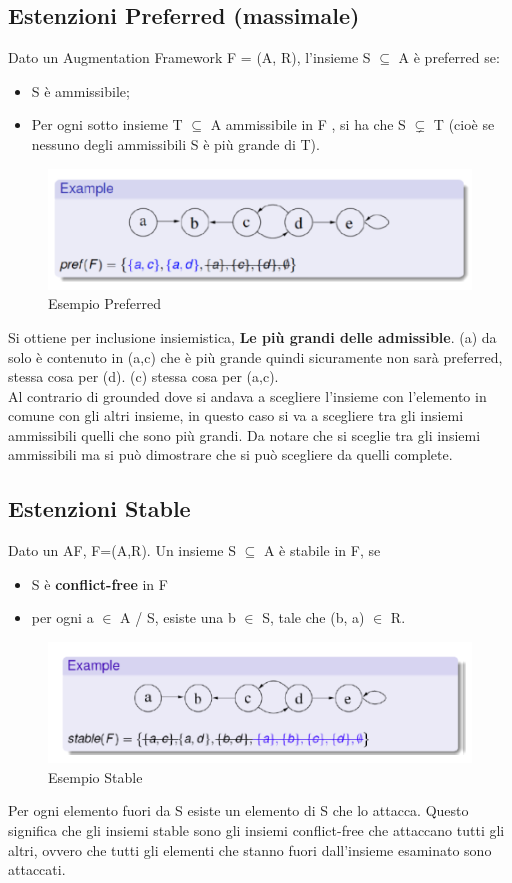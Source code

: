 \subsection{Estenzioni Preferred (massimale)}
Dato un Augmentation Framework F = (A, R), l’insieme S $\subseteq$ A è preferred se:
\begin{itemize}
    \item S è ammissibile;
    \item Per ogni sotto insieme T $\subseteq$ A ammissibile in F , si ha che S $\subsetneq$ T (cioè se nessuno degli ammissibili S è più grande di T).
\end{itemize}
\begin{figure}[htp]
	\centering
    \includegraphics[width=12cm, keepaspectratio]{img/Cap6/prefered.png}
    \caption{Esempio Preferred}
\end{figure}
Si ottiene per inclusione insiemistica, \textbf{Le più grandi delle admissible}. (a) da solo è contenuto in (a,c) che è più grande quindi sicuramente non sarà preferred, stessa cosa per (d). (c) stessa cosa per (a,c).
\\Al contrario di grounded dove si andava a scegliere l’insieme con l’elemento in
comune con gli altri insieme, in questo caso si va a scegliere tra gli insiemi ammissibili
quelli che sono più grandi. Da notare che si sceglie tra gli insiemi ammissibili ma si
può dimostrare che si può scegliere da quelli complete.
\newpage
\subsection{Estenzioni Stable}
Dato un AF, F=(A,R). Un insieme S $\subseteq$ A è stabile in F, se
\begin{itemize}
    \item S è \textbf{conflict-free} in F
    \item per ogni a $\in$ A / S, esiste una b $\in$ S, tale che (b, a) $\in$ R.
\end{itemize}
\begin{figure}[htp]
	\centering
    \includegraphics[width=12cm, keepaspectratio]{img/Cap6/stable.png}
    \caption{Esempio Stable}
\end{figure}
Per ogni elemento fuori da S esiste un elemento di S che lo attacca. Questo significa che gli insiemi stable sono gli insiemi conflict-free che attaccano tutti gli altri, ovvero che tutti gli elementi che stanno fuori dall’insieme esaminato sono attaccati.


